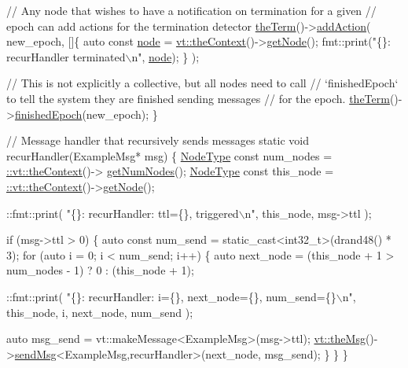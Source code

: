 \begin{DoxyCodeInclude}
  \textcolor{comment}{// Any node that wishes to have a notification on termination for a given}
  \textcolor{comment}{// epoch can add actions for the termination detector}
  \hyperlink{namespacevt_a127580fdfcaba0b4171e5c48c5676733}{theTerm}()->\hyperlink{structvt_1_1term_1_1_term_action_a1227042cb4eb38937fb8ed34bcbdf998}{addAction}(
    new\_epoch, []\{
      \textcolor{keyword}{auto} \textcolor{keyword}{const} \hyperlink{namespacevt_1_1config_a46e57c33bee1b9f1fa95455af86d80e0a576033c81e2ddd03d721ecef3b1b3f81}{node} = \hyperlink{namespacevt_a26551fe0e6e6a1371111df5b12c7e92c}{vt::theContext}()->\hyperlink{structvt_1_1ctx_1_1_context_a0d52c263ce8516546a67443d9a86fa5f}{getNode}();
      fmt::print(\textcolor{stringliteral}{"\{\}: recurHandler terminated\(\backslash\)n"}, \hyperlink{namespacevt_1_1config_a46e57c33bee1b9f1fa95455af86d80e0a576033c81e2ddd03d721ecef3b1b3f81}{node});
    \}
  );

  \textcolor{comment}{// This is not explicitly a collective, but all nodes need to call}
  \textcolor{comment}{// `finishedEpoch` to tell the system they are finished sending messages}
  \textcolor{comment}{// for the epoch.}
  \hyperlink{namespacevt_a127580fdfcaba0b4171e5c48c5676733}{theTerm}()->\hyperlink{structvt_1_1term_1_1_termination_detector_ad54d75c50bd3f34f30247817737bc303}{finishedEpoch}(new\_epoch);
\}

\textcolor{comment}{// Message handler that recursively sends messages}
\textcolor{keyword}{static} \textcolor{keywordtype}{void} recurHandler(ExampleMsg* msg) \{
  \hyperlink{namespacevt_a866da9d0efc19c0a1ce79e9e492f47e2}{NodeType} \textcolor{keyword}{const} num\_nodes = \hyperlink{namespacevt_a26551fe0e6e6a1371111df5b12c7e92c}{::vt::theContext}()->
      \hyperlink{structvt_1_1ctx_1_1_context_a7f41071aadf6d5fa9e1b6c703c5ff19d}{getNumNodes}();
  \hyperlink{namespacevt_a866da9d0efc19c0a1ce79e9e492f47e2}{NodeType} \textcolor{keyword}{const} this\_node = \hyperlink{namespacevt_a26551fe0e6e6a1371111df5b12c7e92c}{::vt::theContext}()->\hyperlink{structvt_1_1ctx_1_1_context_a0d52c263ce8516546a67443d9a86fa5f}{getNode}();

  ::fmt::print(
    \textcolor{stringliteral}{"\{\}: recurHandler: ttl=\{\}, triggered\(\backslash\)n"}, this\_node, msg->ttl
  );

  \textcolor{keywordflow}{if} (msg->ttl > 0) \{
    \textcolor{keyword}{auto} \textcolor{keyword}{const} num\_send = \textcolor{keyword}{static\_cast<}int32\_t\textcolor{keyword}{>}(drand48() * 3);
    \textcolor{keywordflow}{for} (\textcolor{keyword}{auto} i = 0; i < num\_send; i++) \{
      \textcolor{keyword}{auto} next\_node = (this\_node + 1 > num\_nodes - 1) ? 0 : (this\_node + 1);

      ::fmt::print(
        \textcolor{stringliteral}{"\{\}: recurHandler: i=\{\}, next\_node=\{\}, num\_send=\{\}\(\backslash\)n"},
        this\_node, i, next\_node, num\_send
      );

      \textcolor{keyword}{auto} msg\_send = vt::makeMessage<ExampleMsg>(msg->ttl);
      \hyperlink{namespacevt_aeafd31f866aeb4dc6fc2f6ee97136350}{vt::theMsg}()->\hyperlink{group__preregister_ga0162a39473e7f9b490a79a7983d949ac}{sendMsg}<ExampleMsg,recurHandler>(next\_node, msg\_send);
    \}
  \}
\}
\end{DoxyCodeInclude}
